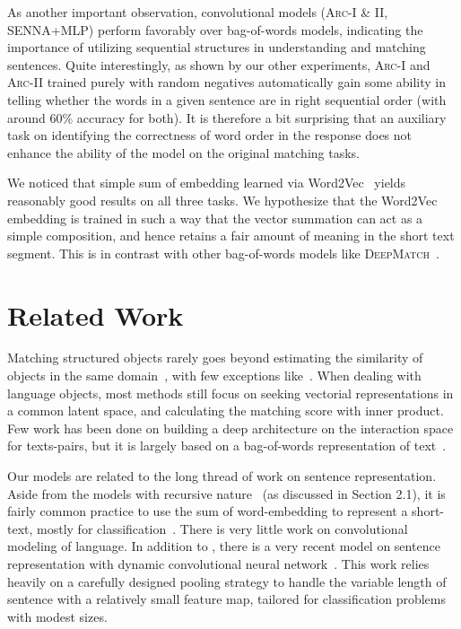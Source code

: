 \documentclass{article} \usepackage{nips14submit_e,times}
\newcommand{\0}{\ensuremath{\mathbf{0}}}
\newcommand{\1}{\ensuremath{\mathbf{1}}}
\begin{document}
As another important observation, convolutional models (\textsc{Arc-I} \& II, \textsc{SENNA+MLP}) perform favorably over bag-of-words models, indicating the importance of utilizing sequential structures in understanding and matching sentences. Quite interestingly, as shown by our other experiments, \textsc{Arc-I} and \textsc{Arc-II} trained purely with random negatives automatically gain some ability in telling whether the words in a given sentence are in right sequential order (with around 60\% accuracy for both). It is therefore a bit surprising that an auxiliary task on identifying the correctness of word order in the response does not enhance the ability of the model on the original matching tasks.

We noticed that simple sum of embedding learned via Word2Vec~\cite{word2vec} yields reasonably good results on all three tasks. We hypothesize that the Word2Vec embedding is trained in such a way that the vector summation can act as a simple composition, and hence retains a fair amount of meaning in the short text segment. This is in contrast with other bag-of-words models like \textsc{DeepMatch}~\cite{nipsmatch}. \vspace{-8pt}

\section{Related Work} \label{s:related}\vspace{-10pt}

Matching structured objects rarely goes beyond estimating the similarity of objects in the same domain~\cite{Sun_2013_ICCV,VishproG,socher2011}, with few exceptions like~\cite{bordes2014semantic,Shenwww2014}. When dealing with language objects, most methods still focus on seeking vectorial representations in a common latent space, and calculating the matching score with inner product\cite{Shenwww2014,baoxunACL}. Few work has been done on building a deep architecture on the interaction space for texts-pairs, but it is largely based on a bag-of-words representation of text~\cite{nipsmatch}.

Our models are related to the long thread of work on sentence representation. Aside from the models with recursive nature~\cite{RNN,RAE,socher2011} (as discussed in Section 2.1), it is fairly common practice to use the sum of word-embedding to represent a short-text, mostly for classification~\cite{yangqiu}. There is very little work on convolutional modeling of language. In addition to \cite{senna,Shenwww2014}, there is a very recent model on sentence representation with dynamic convolutional neural network~\cite{oxford_cnn}. This work relies heavily on a carefully designed pooling strategy to handle the variable length of sentence with a relatively small feature map, tailored for classification problems with modest sizes. \vspace{-8pt}
\end{document}
